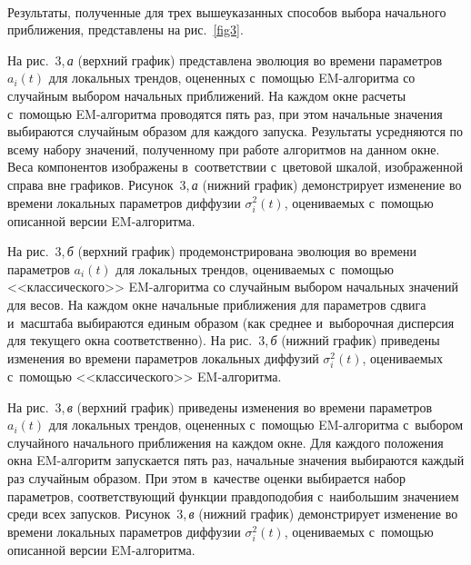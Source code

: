 \begin{multicols}{2}
\begin{figure*} %
\vspace*{1pt}
 \begin{center}
 \mbox{%
 \epsfxsize=148.824mm
 }
 \end{center}
 \vspace*{-11pt}
\end{figure*}

Результаты, полученные для трех вышеуказанных способов выбора
начального приближения, представлены на рис.~\ref{fig3}. 

На рис.~3,\,\textit{а}
(верхний график) представлена эволюция во времени параметров $a_i(t)$ для
локальных трендов, оцененных с~по\-мощью EM-ал\-го\-рит\-ма со случайным
выбором начальных приближений. На каждом окне расчеты с~помощью
EM-ал\-го\-рит\-ма проводятся пять раз, при этом начальные значения
выбираются случайным образом для каждого запуска. Результаты
усредняются по всему набору значений, полученному при работе
алгоритмов на данном окне. Веса компонентов изоб\-ра\-же\-ны 
в~соответствии с~цветовой шкалой, изоб\-ра\-жен\-ной справа вне графиков.
Рисунок~3,\,\textit{а} (нижний график) демонстрирует изменение во времени локальных
параметров диффузии $\sigma_i^2(t)$, оценива\-емых с~по\-мощью описанной
версии EM-ал\-го\-рит\-ма. 

На рис.~3,\,\textit{б}
(верхний график) продемонстрирована эволюция
во времени параметров $a_i(t)$ для локальных трендов, оценива\-емых 
с~по\-мощью <<классического>> EM-ал\-го\-рит\-ма со случайным выбором
начальных значений для весов. На каждом окне начальные приближения
для параметров сдвига и~масштаба выбираются единым образом (как
среднее и~выборочная дисперсия для текущего окна соответственно). На
рис.~3,\,\textit{б} (нижний график) приведены изменения во времени параметров
локальных диффузий $\sigma_i^2(t)$, оцениваемых с~по\-мощью
<<классического>> EM-ал\-го\-рит\-ма. 

На рис.~3,\,\textit{в} (верхний график) приведены изменения
во времени параметров $a_i(t)$ для локальных трендов, оцененных 
с~по\-мощью EM-ал\-го\-рит\-ма с~выбором случайного начального приближения на
каждом окне. Для каждого положения окна EM-ал\-го\-ритм запускается пять
раз, начальные значения выбираются каждый раз случайным образом. При
этом в~качестве оценки выбирается набор параметров, соответствующий
функции правдоподобия с~наибольшим значением среди всех запусков.
Рисунок~3,\,\textit{в} (нижний график) демонстрирует изменение во времени локальных
параметров диффузии $\sigma_i^2(t)$, оцениваемых с~по\-мощью описанной
версии EM-ал\-го\-ритма.


\end{multicols}
